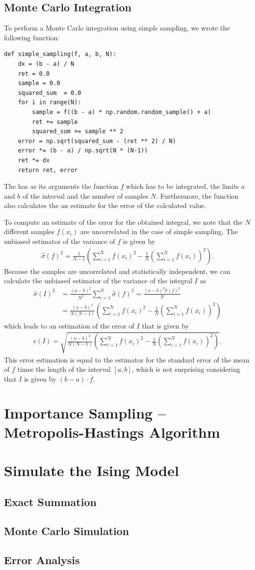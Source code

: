 \documentclass[a4paper,10pt,bibtotoc]{scrartcl}
\begin{document}
\subsection{Monte Carlo Integration}
To perform a Monte Carlo integration using simple sampling, we wrote the following function:
\begin{lstlisting}
def simple_sampling(f, a, b, N):
    dx = (b - a) / N
    ret = 0.0
    sample = 0.0
    squared_sum  = 0.0
    for i in range(N):
        sample = f((b - a) * np.random.random_sample() + a)
        ret += sample
        squared_sum += sample ** 2
    error = np.sqrt(squared_sum - (ret ** 2) / N)
    error *= (b - a) / np.sqrt(N * (N-1))
    ret *= dx
    return ret, error
\end{lstlisting}
The has as its arguments the function $f$ which has to be integrated, the limits $a$ and $b$ of the interval and the number of samples $N$. 
Furthermore, the function also calculates the an estimate for the error of the calculated value.

To compute an estimate of the error for the obtained integral, we note that the $N$ different samples $f(x_i)$ are uncorrelated in the case of simple sampling.
The unbiased estimator of the variance of $f$ is given by
\begin{align}
\hat{\sigma}(f)^2 = \frac{1}{N-1}\left(\sum_{i=1}^{N}f(x_i)^2-\frac{1}{N}\left(\sum_{i=1}^{N}f(x_i)\right)^2\right).
\end{align}
Because the samples are uncorrelated and statistically independent, we can calculate the unbiased estimator of the variance of the integral $I$ as
\begin{align}
\hat{\sigma}(I)^2 &= \frac{\left(a-b\right)^2}{N^2}\sum_{i=1}^{N} \hat{\sigma}(f)^2 = \frac{\left(a-b\right)^2\hat{\sigma}(f)^2}{N}\\
&=\frac{\left(a-b\right)^2}{N\left(N-1\right)}\left(\sum_{i=1}^{N}f(x_i)^2-\frac{1}{N}\left(\sum_{i=1}^{N}f(x_i)\right)^2\right)
\end{align}
which leads to an estimation of the error of $I$ that is given by
\begin{align}
\epsilon(I)=\sqrt{\frac{\left(a-b\right)^2}{N\left(N-1\right)}\left(\sum_{i=1}^{N}f(x_i)^2-\frac{1}{N}\left(\sum_{i=1}^{N}f(x_i)\right)^2\right)}.
\end{align}
This error estimation is equal to the estimator for the standard error of the mean of $f$ times the length of the interval $[a,b]$, which is not surprising considering that $I$ is given by $\left(b-a\right)\cdot \overline{f}$.




\section{Importance Sampling -- Metropolis-Hastings Algorithm}
\section{Simulate the Ising Model}
\subsection{Exact Summation}
\subsection{Monte Carlo Simulation}
\subsection{Error Analysis}
\end{document}

